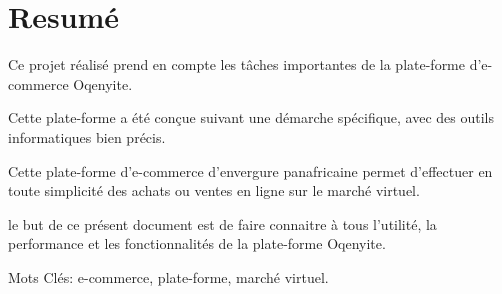 \chapter{Resumé}
	
	
  Ce projet réalisé prend en compte les tâches importantes de la plate-forme d'e-commerce Oqenyite.
  
  Cette plate-forme a été conçue suivant une démarche spécifique, avec des outils informatiques bien
  précis.
  
  Cette plate-forme d'e-commerce d’envergure panafricaine permet d’effectuer en toute simplicité des achats ou ventes en ligne sur le marché virtuel.
  
  le but de ce présent document est de faire connaitre à tous l'utilité, la performance et les fonctionnalités de la plate-forme Oqenyite.
	
	
   Mots Clés:
e-commerce, plate-forme, marché virtuel.
	
	